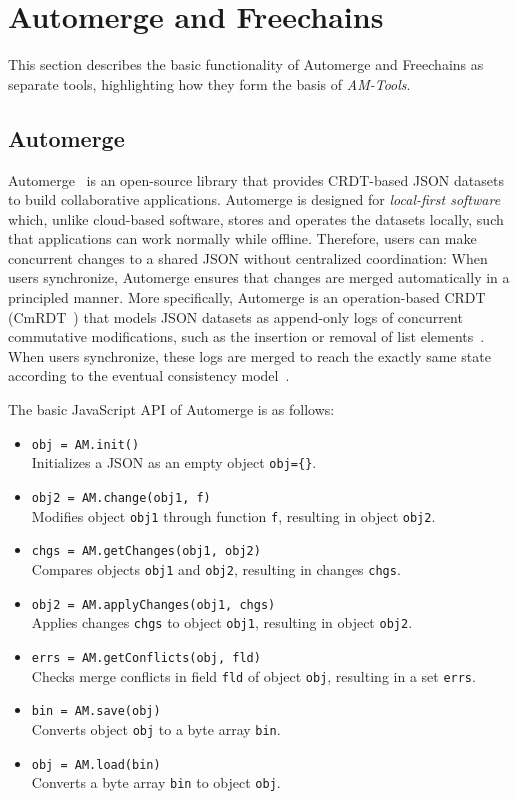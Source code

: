 \documentclass[12pt]{article}
\newcommand{\AMT}      {\emph{AM-Tools}\xspace}
\newcommand{\code}[1]  {\texttt{\footnotesize{#1}}}
\begin{document}
\section{Automerge and Freechains}
\label{sec.both}

This section describes the basic functionality of Automerge and Freechains as
separate tools, highlighting how they form the basis of \AMT.

\subsection{Automerge}
\label{sec.both.automerge}

Automerge~\cite{kleppmann2018automerge} is an open-source library that provides
CRDT-based JSON datasets to build collaborative applications.
%
Automerge is designed for \emph{local-first software}~\cite{p2p.local} which,
unlike cloud-based software, stores and operates the datasets locally, such
that applications can work normally while offline.
%
Therefore, users can make concurrent changes to a shared JSON without
centralized coordination:
When users synchronize, Automerge ensures that changes are merged automatically
in a principled manner.
%
More specifically, Automerge is an operation-based CRDT
(CmRDT~\cite{p2p.crdts}) that models JSON datasets as append-only logs of
concurrent commutative modifications, such as the insertion or removal of list
elements~\cite{kleppmann2017conflict}.
%
When users synchronize, these logs are merged to reach the exactly same state
according to the eventual consistency model~\cite{p2p.sec}.

The basic JavaScript API of Automerge is as follows:

\begin{itemize}
\item \code{obj = AM.init()} \\
    Initializes a JSON as an empty object \code{obj=\{\}}.
\item \code{obj2 = AM.change(obj1, f)} \\
    Modifies object \code{obj1} through function \code{f}, resulting in
    object \code{obj2}.
\item \code{chgs = AM.getChanges(obj1, obj2)} \\
    Compares objects \code{obj1} and \code{obj2}, resulting in changes
    \code{chgs}.
\item \code{obj2 = AM.applyChanges(obj1, chgs)} \\
    Applies changes \code{chgs} to object \code{obj1}, resulting in object
    \code{obj2}.
\item \code{errs = AM.getConflicts(obj, fld)} \\
    Checks merge conflicts in field \code{fld} of object \code{obj}, resulting
    in a set \code{errs}.
\item \code{bin = AM.save(obj)} \\
    Converts object \code{obj} to a byte array \code{bin}.
\item \code{obj = AM.load(bin)} \\
    Converts a byte array \code{bin} to object \code{obj}.
\end{itemize}
\end{document}
